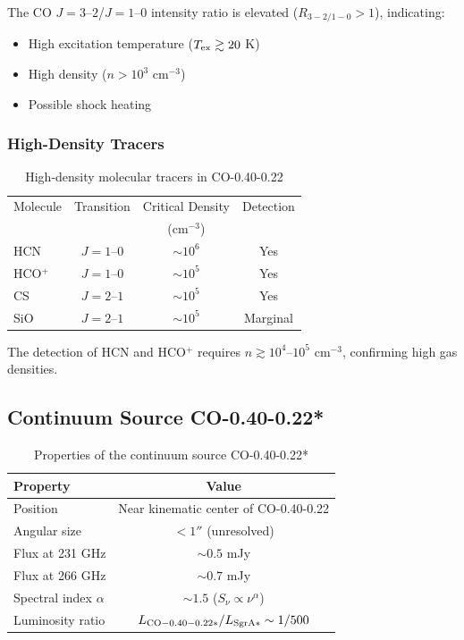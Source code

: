 \documentclass[twocolumn,amsmath,amssymb,prd,superscriptaddress,nofootinbib]{revtex4-2}
\begin{document}
The CO $J=3\text{--}2$/$J=1\text{--}0$ intensity ratio is elevated ($R_{3-2/1-0} > 1$), indicating:
\begin{itemize}
    \item High excitation temperature ($T_{\rm ex} \gtrsim 20$ K)
    \item High density ($n > 10^3$ cm$^{-3}$)
    \item Possible shock heating
\end{itemize}

\subsubsection{High-Density Tracers}

\begin{table}[h]
\centering
\caption{High-density molecular tracers in CO-0.40-0.22}
\label{tab:dense_tracers}
\begin{tabular}{lccc}
\toprule
Molecule & Transition & Critical Density & Detection \\
 & & (cm$^{-3}$) & \\
\midrule
HCN & $J=1\text{--}0$ & $\sim 10^6$ & Yes \\
HCO$^+$ & $J=1\text{--}0$ & $\sim 10^5$ & Yes \\
CS & $J=2\text{--}1$ & $\sim 10^5$ & Yes \\
SiO & $J=2\text{--}1$ & $\sim 10^5$ & Marginal \\
\bottomrule
\end{tabular}
\end{table}

The detection of HCN and HCO$^+$ requires $n \gtrsim 10^4$--$10^5$ cm$^{-3}$, confirming high gas densities.

\subsection{Continuum Source CO-0.40-0.22*}

\begin{table}[h]
\centering
\caption{Properties of the continuum source CO-0.40-0.22* \cite{Oka2017}}
\label{tab:continuum}
\begin{tabular}{lc}
\toprule
Property & Value \\
\midrule
Position & Near kinematic center of CO-0.40-0.22 \\
Angular size & $< 1''$ (unresolved) \\
Flux at 231 GHz & $\sim 0.5$ mJy \\
Flux at 266 GHz & $\sim 0.7$ mJy \\
Spectral index $\alpha$ & $\sim 1.5$ ($S_\nu \propto \nu^\alpha$) \\
Luminosity ratio & $L_{\rm CO-0.40-0.22*}/L_{\rm Sgr A*} \sim 1/500$ \\
\bottomrule
\end{tabular}
\end{table}
\end{document}
